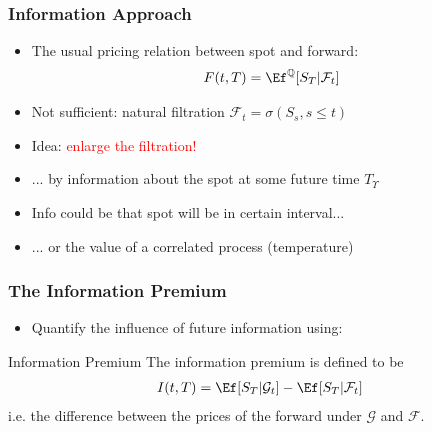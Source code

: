 \begin{frame}
  \frametitle{Information Approach}
\vspace{-0.5cm}

\begin{itemize}
\item The usual pricing relation between spot and forward:
\begin{align*}
F(t,T)=\Ef^\mathbb{Q}[S_T|\mathcal{F}_t]
\end{align*}
\item Not sufficient: natural filtration $\mathcal{F}_t = \sigma(S_s, s\leq t)$
\vspace{0.5cm}
\pause
\item Idea: \textcolor{red}{enlarge the filtration!}
\vspace{0.5cm}
\pause
\item ... by information about the spot at some future time $T_\Upsilon$
\item Info could be that spot will be in certain interval...
\item ... or the value of a correlated process (temperature)
\end{itemize}
\end{frame}


\begin{frame}
  \frametitle{The Information Premium}
\vspace{-0.5cm}

\begin{itemize}
\item Quantify the influence of future information using:
\end{itemize}
\begin{block}{Information Premium}
The information premium is defined to be
\begin{align*}
I(t,T) = \Ef[S_T | \mathcal{G}_t] - \Ef[S_T | \mathcal{F}_t]
\end{align*}
i.e. the difference between the prices of the forward under $\mathcal{G}$ and $\mathcal{F}$.
\end{block}
\end{frame}






